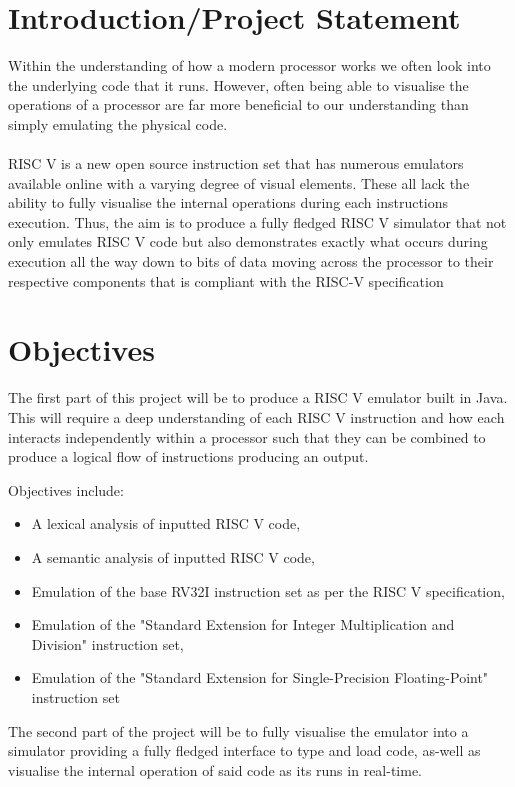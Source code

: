 \documentclass[a4paper,fleqn,12pt]{article}
\begin{document}


\pagestyle{plain}

\section{Introduction/Project Statement}
Within the understanding of how a modern processor works we often look into the underlying code that it runs. However, often being able to visualise
the operations of a processor are far more beneficial to our understanding than simply emulating the physical code.
\\\\
RISC V is a new open source instruction set that has numerous emulators available online with a varying degree of visual elements.
These all lack the ability to fully visualise the internal operations during each instructions execution. Thus, the aim is to produce a fully fledged RISC V simulator that not only emulates RISC V code but also demonstrates exactly what occurs during execution all the way down to bits of data moving across the processor to their respective components that is compliant with the RISC-V specification \cite{risc_spec}

\section{Objectives}
The first part of this project will be to produce a RISC V emulator built in Java. This will require a deep understanding of each RISC V instruction and how each interacts independently within a processor such that they can be combined to produce a logical flow of instructions producing an output.

Objectives include:
\begin{itemize}
    \item A lexical analysis of inputted RISC V code,
    \item A semantic analysis of inputted RISC V code,
    \item Emulation of the base RV32I instruction set as per the RISC V specification,
    \item Emulation of the "Standard Extension for Integer Multiplication and Division" instruction set, \label{obj:md}
    \item Emulation of the "Standard Extension for Single-Precision Floating-Point" instruction set \label{obj:fp}
\end{itemize}

The second part of the project will be to fully visualise the emulator into a simulator providing a fully fledged interface to type and load code, as-well as visualise the internal operation of said code as its runs in real-time.
\end{document}
